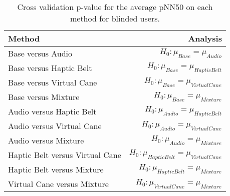 
\begin{table}[!htb]
\centering
\caption{Cross validation p-value for the average pNN50 on each method for blinded users.}
\label{tab:lsd_average_pnn50}
\begin{tabular}{lr}
\toprule
                         Method &                                       Analysis \\
\midrule
              Base versus Audio &               $H_0 : \mu_{Base} = \mu_{Audio}$ \\
        Base versus Haptic Belt &         $H_0 : \mu_{Base} = \mu_{Haptic Belt}$ \\
       Base versus Virtual Cane &        $H_0 : \mu_{Base} = \mu_{Virtual Cane}$ \\
            Base versus Mixture &             $H_0 : \mu_{Base} = \mu_{Mixture}$ \\
       Audio versus Haptic Belt &        $H_0 : \mu_{Audio} = \mu_{Haptic Belt}$ \\
      Audio versus Virtual Cane &       $H_0 : \mu_{Audio} = \mu_{Virtual Cane}$ \\
           Audio versus Mixture &            $H_0 : \mu_{Audio} = \mu_{Mixture}$ \\
Haptic Belt versus Virtual Cane & $H_0 : \mu_{Haptic Belt} = \mu_{Virtual Cane}$ \\
     Haptic Belt versus Mixture &      $H_0 : \mu_{Haptic Belt} = \mu_{Mixture}$ \\
    Virtual Cane versus Mixture &     $H_0 : \mu_{Virtual Cane} = \mu_{Mixture}$ \\
\bottomrule
\end{tabular}
\end{table}

